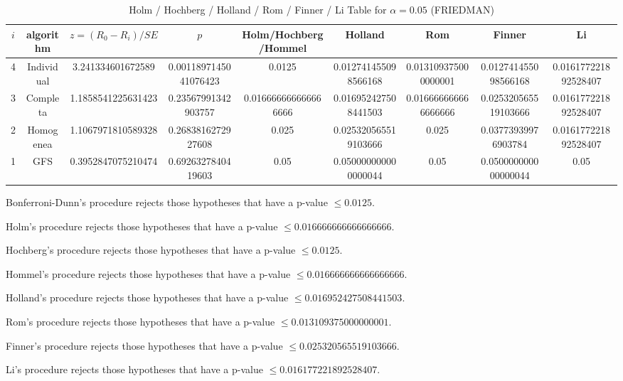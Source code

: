 \documentclass[a4paper,10pt]{article}
\begin{document}
\begin{landscape}
\begin{table}[!htp]
\centering\scriptsize
\caption{Holm / Hochberg / Holland / Rom / Finner / Li Table for $\alpha=0.05$ (FRIEDMAN)}
\begin{tabular}{ccccccccc}
$i$&algorithm&$z=(R_0 - R_i)/SE$&$p$&Holm/Hochberg/Hommel&Holland&Rom&Finner&Li\\
\hline
4&Individual&3.241334601672589&0.0011897145041076423&0.0125&0.012741455098566168&0.013109375000000001&0.012741455098566168&0.016177221892528407\\
3&Completa&1.1858541225631423&0.23567991342903757&0.016666666666666666&0.016952427508441503&0.016666666666666666&0.025320565519103666&0.016177221892528407\\
2&Homogenea&1.1067971810589328&0.2683816272927608&0.025&0.025320565519103666&0.025&0.03773939976903784&0.016177221892528407\\
1&GFS&0.3952847075210474&0.6926327840419603&0.05&0.050000000000000044&0.05&0.050000000000000044&0.05\\
\hline
\end{tabular}
\end{table}
Bonferroni-Dunn's procedure rejects those hypotheses that have a p-value $\le0.0125$.


Holm's procedure rejects those hypotheses that have a p-value $\le0.016666666666666666$.


Hochberg's procedure rejects those hypotheses that have a p-value $\le0.0125$.


Hommel's procedure rejects those hypotheses that have a p-value $\le0.016666666666666666$.


Holland's procedure rejects those hypotheses that have a p-value $\le0.016952427508441503$.


Rom's procedure rejects those hypotheses that have a p-value $\le0.013109375000000001$.


Finner's procedure rejects those hypotheses that have a p-value $\le0.025320565519103666$.


Li's procedure rejects those hypotheses that have a p-value $\le0.016177221892528407$.



\newpage


\end{landscape}
\end{document}
